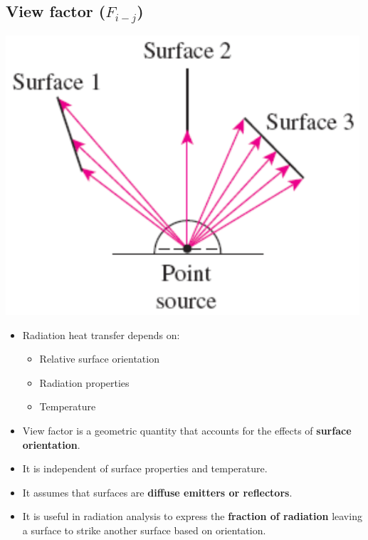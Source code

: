 \documentclass[11pt]{article}
\begin{document}
\subsection{View factor (\(F_{i-j}\))}
\label{sec:org4765ee3}
\begin{center}
\includegraphics[width=.9\linewidth]{./images/view-factor-diagram.png}
\end{center}
\begin{itemize}
\item Radiation heat transfer depends on:
\begin{itemize}
\item Relative surface orientation
\item Radiation properties
\item Temperature
\end{itemize}
\item View factor is a geometric quantity that accounts for the effects of \textbf{surface orientation}.
\item It is independent of surface properties and temperature.
\item It assumes that surfaces are \textbf{diffuse emitters or reflectors}.
\item It is useful in radiation analysis to express the \textbf{fraction of radiation} leaving a surface to strike another surface based on orientation.
\end{itemize}
\end{document}
